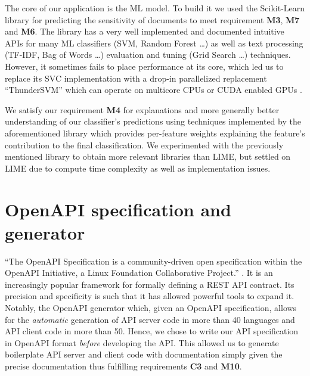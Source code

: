 \documentclass[\version]{l4proj}
\begin{document}
The core of our application is the ML model.
To build it we used the Scikit-Learn library \autocite{pedregosaScikitlearnMachineLearning2011} for predicting the sensitivity of documents to meet requirement \textbf{M3}, \textbf{M7} and \textbf{M6}.
The library has a very well implemented and documented intuitive APIs for many ML classifiers (SVM, Random Forest \ldots) as well as text processing (TF-IDF, Bag of Words \ldots) evaluation and tuning (Grid Search \ldots) techniques.
However, it sometimes fails to place performance at its core, which led us to replace its SVC implementation with a drop-in parallelized replacement ``ThunderSVM'' which can operate on multicore CPUs or CUDA enabled GPUs \autocite{wenThunderSVMFastSVM2018}.

We satisfy our requirement \textbf{M4} for explanations and more generally better understanding of our classifier's predictions using techniques implemented by the aforementioned \textcite{ribeiroMarcotcrLime2020} library \autocite{ribeiroWhyShouldTrust2016} which provides per-feature weights explaining the feature's contribution to the final classification.
We experimented with the previously mentioned \textcite{lundbergSlundbergShap2020} library to obtain more relevant libraries than LIME, but settled on LIME due to compute time complexity as well as implementation issues.

\section{OpenAPI specification and generator}

``The OpenAPI Specification is a community-driven open specification within the OpenAPI Initiative, a Linux Foundation Collaborative Project.'' \autocite{OAIOpenAPISpecification2020}.
It is an increasingly popular framework for formally defining a REST API contract.
Its precision and specificity is such that it has allowed powerful tools to expand it.
Notably, the OpenAPI generator \autocite{OpenAPIToolsOpenapigenerator2020} which, given an OpenAPI specification, allows for the \textit{automatic} generation of API server code in more than 40 languages and API client code in more than 50.
Hence, we chose to write our API specification in OpenAPI format \textit{before} developing the API.
This allowed us to generate boilerplate API server and client code with documentation simply given the precise documentation thus fulfilling requirements \textbf{C3} and \textbf{M10}.
\end{document}
